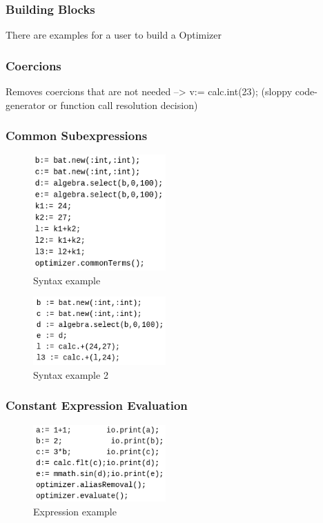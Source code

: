 \documentclass[11pt]{article}
\begin{document}
\subsubsection{Building Blocks}
\label{sec:org8a71914}
There are examples for a user to build a Optimizer
\subsubsection{Coercions}
\label{sec:org61b41fb}
Removes coercions that are not needed --> v:= calc.int(23);
(sloppy code-generator or function call resolution decision)

\subsubsection{Common Subexpressions}
\label{sec:org7c3c819}
\begin{figure}[htbp]
\centering
\includegraphics[width=2.0in]{./Pictures/opt-common-subs-1.png}
\caption{\label{fig:org7125cc8}
Syntax example}
\end{figure}              

\begin{figure}[htbp]
\centering
\includegraphics[width=2.0in]{./Pictures/opt-common-subs-1+.png}
\caption{\label{fig:orge7ad7c9}
Syntax example 2}
\end{figure}

\subsubsection{Constant Expression Evaluation}
\label{sec:orga210bc4}

\begin{figure}[htbp]
\centering
\includegraphics[width=2.0in]{./Pictures/const-exps-eval-1.png}
\caption{\label{fig:orga8c0465}
Expression example}
\end{figure}             
\end{document}
